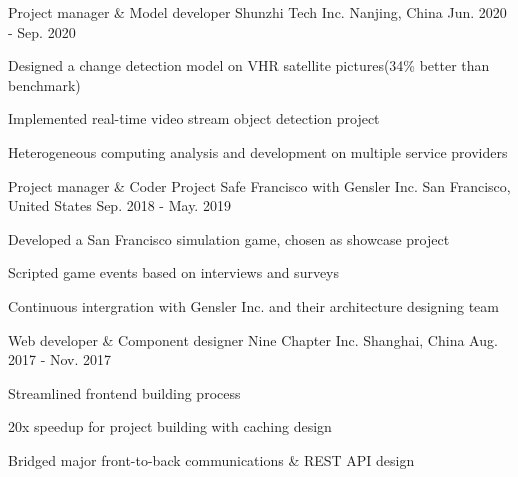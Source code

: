 \begin{cventries}
  \cventry
    {Project manager \& Model developer}
    {Shunzhi Tech Inc.}
    {Nanjing, China}
    {Jun. 2020 - Sep. 2020}
    {
      \begin{cvitems}
        \item {Designed a change detection model on VHR satellite pictures(34\% better than benchmark)}
        \item {Implemented real-time video stream object detection project}
        \item {Heterogeneous computing analysis and development on multiple service providers}
      \end{cvitems}
    }
  \begin{comment}
  \cventry
    {Consultant}
    {Consulting with Frauenmond, TBM Inc.}
    {Seoul, Korea}
    {Oct. 2019 - Dec. 2019}
    {
      \begin{cvitems}
        \item {Analyzed Korean chocolate market with Porter's Five Forces Model and managerial accounting}
        \item {Strategized with Encouragement Study based on Genetic Matching and Regression Discontinuity}
        \item {Offered Neural Network model for Alpha/Beta tests on feature designing}
      \end{cvitems}
    }
  \end{comment}

  \cventry
    {Project manager \& Coder}
    {Project Safe Francisco with Gensler Inc.}
    {San Francisco, United States}
    {Sep. 2018 - May. 2019}
    {
      \begin{cvitems}
        \item {Developed a San Francisco simulation game, chosen as showcase project}
        \item {Scripted game events based on interviews and surveys}
        \item {Continuous intergration with Gensler Inc. and their architecture designing team}
      \end{cvitems}
    }

  \cventry
    {Web developer \& Component designer}
    {Nine Chapter Inc.}
    {Shanghai, China}
    {Aug. 2017 - Nov. 2017}
    {
      \begin{cvitems}
        \item {Streamlined frontend building process}
        \item {20x speedup for project building with caching design}
        \item {Bridged major front-to-back communications \& REST API design}
      \end{cvitems}
    }


\end{cventries}

